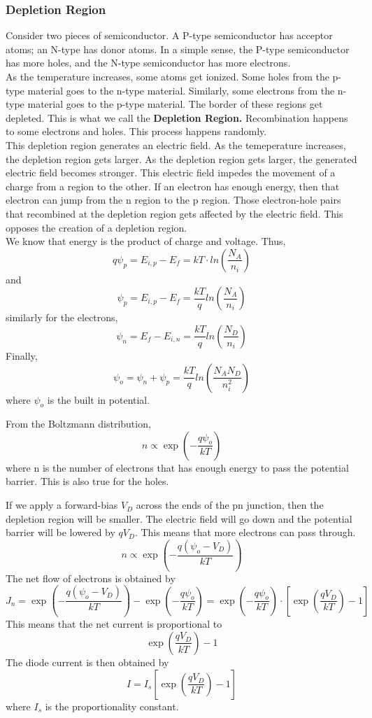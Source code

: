 \documentclass{article}
\begin{document}
\subsubsection{Depletion Region}
\noindent 
Consider two pieces of semiconductor. A P-type semiconductor has acceptor atoms; 
an N-type has donor atoms. In a simple sense, the P-type semiconductor has more holes,
and the N-type semiconductor has more electrons. 
\vspace{8pt}
\\
As the temperature increases, some atoms get ionized. Some holes from the p-type 
material goes to the n-type material. Similarly, some electrons from the n-type 
material goes to the p-type material. The border of these regions get depleted. 
This is what we call the \textbf{Depletion Region.} Recombination happens to some 
electrons and holes. This process happens randomly. 
\vspace{8pt}
\\ This depletion region generates an electric field. As the temeperature increases, 
the depletion region gets larger. As the depletion region gets larger, the generated
electric field becomes stronger. This electric field impedes the movement of a charge
from a region to the other. If an electron has enough energy, then that electron can 
jump from the n region to the p region. Those electron-hole pairs that recombined at 
the depletion region gets affected by the electric field. This opposes the creation of
a depletion region. 
\vspace{8pt}
\\ We know that energy is the product of charge and voltage. Thus,
$$q\psi_p = E_{i,p} - E_{f} = kT \cdot ln\left(\frac{N_A}{n_i}\right)$$
and $$\psi_p = E_{i,p} - E_{f} = \frac{kT}{q} ln\left(\frac{N_A}{n_i}\right)$$
similarly for the electrons, 
$$\psi_n = E_{f} - E_{i,n} = \frac{kT}{q} ln\left(\frac{N_D}{n_i}\right)$$
Finally, 
$$\boxed{\psi_o = \psi_n + \psi_p = \frac{kT}{q}ln\left(\frac{N_A N_D}{n_i^2} \right)}$$ 
where $\psi_o$ is the built in potential. 

\vspace{8pt}
\noindent  
From the Boltzmann distribution, 
$$n \propto \exp\left(-\frac{q\psi_o}{kT}\right)$$
where n is the number of electrons that has enough energy to pass the potential barrier.
This is also true for the holes. 

\vspace{8pt}
\noindent  
If we apply a forward-bias $V_D$ across the ends of the pn junction, then the depletion 
region will be smaller. The electric field will go down and the potential barrier will 
be lowered by $qV_D$. This means that more electrons can pass through. 
$$n \propto \exp\left(-\frac{q(\psi_o -V_D)}{kT}\right)$$ The net flow of electrons is 
obtained by $$\boxed{J_n = \exp\left(-\frac{q(\psi_o -V_D)}{kT}\right)-
\exp\left(-\frac{q\psi_o}{kT}\right) = \exp\left(-\frac{q\psi_o}{kT}\right)\cdot 
\left[\exp\left(\frac{qV_D}{kT}\right)-1\right]}$$
This means that the net current is proportional to
$$\exp\left(\frac{qV_D}{kT}\right)-1$$
The diode current is then obtained by 
$$\boxed{I = I_s \left[\exp\left(\frac{qV_D}{kT}\right)-1\right]}$$ 
where $I_s$ is the proportionality constant. 
\end{document}
